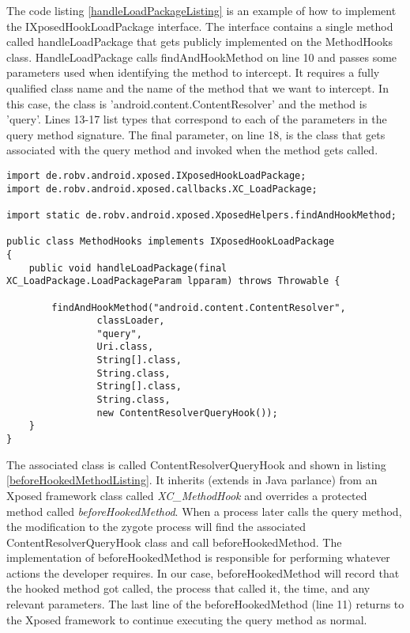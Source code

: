 The code listing \ref{handleLoadPackageListing} is an example of how to implement the IXposedHookLoadPackage interface.  The interface contains a single method called handleLoadPackage that gets publicly implemented on the MethodHooks class.  HandleLoadPackage calls findAndHookMethod on line 10 and passes some parameters used when identifying the method to intercept.  It requires a fully qualified class name and the name of the method that we want to intercept.  In this case, the class is 'android.content.ContentResolver' and the method is 'query'.  Lines 13-17 list types that correspond to each of the parameters in the query method signature.  The final parameter, on line 18, is the class that gets associated with the query method and invoked when the method gets called.\\

\begin{lstlisting}[caption=handleLoadPackage example, label=handleLoadPackageListing]
import de.robv.android.xposed.IXposedHookLoadPackage;
import de.robv.android.xposed.callbacks.XC_LoadPackage;

import static de.robv.android.xposed.XposedHelpers.findAndHookMethod;

public class MethodHooks implements IXposedHookLoadPackage
{
    public void handleLoadPackage(final XC_LoadPackage.LoadPackageParam lpparam) throws Throwable {

        findAndHookMethod("android.content.ContentResolver",
                classLoader,
                "query",
                Uri.class,
                String[].class,
                String.class,
                String[].class,
                String.class,
                new ContentResolverQueryHook());
    }
}
\end{lstlisting}

The associated class is called ContentResolverQueryHook and shown in listing \ref{beforeHookedMethodListing}.  It inherits (extends in Java parlance) from an Xposed framework class called \emph{XC\_MethodHook} and overrides a protected method called \emph{beforeHookedMethod}.  When a process later calls the query method, the modification to the zygote process will find the associated ContentResolverQueryHook class and call beforeHookedMethod.  The implementation of beforeHookedMethod is responsible for performing whatever actions the developer requires.  In our case, beforeHookedMethod will record that the hooked method got called, the process that called it, the time, and any relevant parameters.  The last line of the beforeHookedMethod (line 11) returns to the Xposed framework to continue executing the query method as normal.\\


